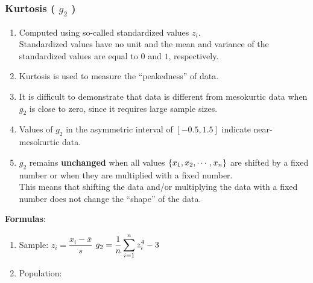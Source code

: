 \subsubsection{Kurtosis ( $g_2$ ) \cite{statistics/book/Statistics-for-Data-Scientists/Maurits-Kaptein}} \label{Data/Describing Data/Central Tendency/Kurtosis}

\begin{enumerate}
    \item Computed using so-called standardized values $z_i$. \hfill \cite{statistics/book/Statistics-for-Data-Scientists/Maurits-Kaptein}\\
    Standardized values have no unit and the mean and variance of the standardized values are equal to $0$ and $1$, respectively. \hfill \cite{statistics/book/Statistics-for-Data-Scientists/Maurits-Kaptein}

    \item Kurtosis is used to measure the “peakedness” of data. \hfill \cite{statistics/book/Statistics-for-Data-Scientists/Maurits-Kaptein}

    \item It is difficult to demonstrate that data is different from mesokurtic data when $g_2$ is close to zero, since it requires large sample sizes. \hfill \cite{statistics/book/Statistics-for-Data-Scientists/Maurits-Kaptein}

    \item Values of $g_2$ in the asymmetric interval of $[-0.5, 1.5]$ indicate near-mesokurtic data. \hfill \cite{statistics/book/Statistics-for-Data-Scientists/Maurits-Kaptein}

    \item $g_2$ remains \textbf{unchanged} when all values $\left\{x_1, x_2, \cdots, x_n\right\}$ are shifted by a fixed number or when they are multiplied with a fixed number. \hfill \cite{statistics/book/Statistics-for-Data-Scientists/Maurits-Kaptein} \\
    This means that shifting the data and/or multiplying the data with a fixed number does not change the “shape” of the data. \hfill \cite{statistics/book/Statistics-for-Data-Scientists/Maurits-Kaptein}
\end{enumerate}


\vspace{0.3cm}
\textbf{Formulas}:
\begin{enumerate}
    \item Sample:
    \label{Data/Describing Data/Central Tendency/Kurtosis/Sample}
    \label{Data/Describing Data/Central Tendency/Kurtosis/z-value}
    \hspace{1cm}  
    $z_i = \dfrac{x_i - \bar{x}}{s}$ 
    \hspace{1cm}
    $g_2 = \dfrac{1}{n} \displaystyle\sum_{i=1}^{n} z_i^4 - 3$
    

    \item Population:
\end{enumerate}



